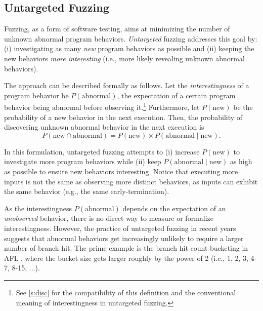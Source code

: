 \documentclass[letterpaper,twocolumn,10pt]{article}
\begin{document}

\subsection{Untargeted Fuzzing}
\label{s:fuzz:unfuzz}

Fuzzing, as a form of software testing, aims at minimizing the number of unknown
abnormal program behaviors. \emph{Untargeted} fuzzing addresses this goal by:
(i) investigating as many \emph{new} program behaviors as possible and (ii)
keeping the new behaviors \emph{more interesting} (i.e., more likely revealing
unknown abnormal behaviors).

%
The approach can be described formally as follows. Let the
\emph{interestingness} of a program behavior be $P(\mathrm{abnormal})$, the
expectation of a certain program behavior being abnormal before observing
it.\footnote{See \autoref{s:disc} for the compatibility of this definition and
the conventional meaning of interestingness in untargeted fuzzing.} Furthermore,
let $P(\mathrm{new})$ be the probability of a new behavior in the next
execution.  Then, the probability of discovering unknown abnormal behavior in
the next execution is
%
\begin{equation}
  P(\mathrm{new} \cap \mathrm{abnormal}) = P(\mathrm{new}) \times P(\mathrm{abnormal} \mid \mathrm{new}).
\end{equation}

In this formulation, untargeted fuzzing attempts to (i) increase
$P(\mathrm{new})$ to investigate more program behaviors while (ii) keep 
$P(\mathrm{abnormal} \mid \mathrm{new})$ as high as possible to ensure new
behaviors interesting.
%
Notice that executing more inputs is not the same as observing more distinct
behaviors, as inputs can exhibit the same behavior (e.g., the same
early-termination).

%
As the interestingness $P(\mathrm{abnormal})$ depends on the expectation of an
\emph{unobserved} behavior, there is no direct way to measure or formalize
interestingness. However, the practice of untargeted fuzzing in recent years
suggests that abnormal behaviors get increasingly unlikely to require a
larger number of branch hit.
%
The prime example is the branch hit count bucketing in AFL \cite{afl}, where the
bucket size gets larger roughly by the power of 2 (i.e., 1, 2, 3, 4-7, 8-15,
...).
%
\end{document}
